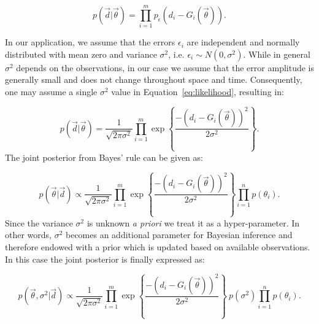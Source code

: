 \begin{equation} 
p(\vec d |  \vec{\theta}) 
= 
\prod_{i=1}^m  
p_\epsilon (d_i - G_i(\vec \theta)).  	
\label{eq:likelihood}
\end{equation}

In our application, we assume that the errors $\epsilon_i$ are independent
and normally distributed with mean
zero and variance $\sigma^2$, i.e. $\epsilon_i \sim N(0,\sigma^2)$. 
While in general $\sigma^2$ depends on the observations, in our case we assume that the error
amplitude is generally small and does not change throughout space and time.
Consequently, one may assume a single $\sigma^2$ value in Equation~\eqref{eq:likelihood},
resulting in:

\begin{equation} 
p(\vec d |  \vec{\theta}) 
= 
\frac{1}{\sqrt{2 \pi \sigma^2}}\prod_{i=1}^m   
\exp \left\lbrace \frac{-(d_i - G_i(\vec \theta))^2}{2 \sigma^2} \right\rbrace. 	
\label{eq:likelihood2}
\end{equation}
The joint posterior from Bayes' rule can be given as:

\begin{equation} 
p(\vec{\theta}| \vec d)
\propto
\frac{1}{\sqrt{2 \pi \sigma^2}}   \prod_{i=1}^m  
\exp \left\lbrace \frac{-(d_i - G_i(\vec \theta))^2}{2 \sigma^2} \right\rbrace  
\prod_{i=1}^n p(\theta_i).
\end{equation}
Since the variance $\sigma^2$ is unknown \emph{a priori}\comment{;} we treat it as a hyper-parameter.
In other words, $\sigma^2$ becomes an additional parameter for Bayesian inference and  
therefore endowed with a prior which is updated based on available observations. In this 
case the joint posterior is finally expressed as:

\begin{equation} 
p(\vec{\theta},\sigma^2 | \vec d)
\propto
\frac{1}{\sqrt{2 \pi \sigma^2}}   \prod_{i=1}^m  
\exp \left\lbrace \frac{-(d_i - G_i(\vec \theta))^2}{2 \sigma^2} \right\rbrace
\ p(\sigma^2) \prod_{i=1}^n p(\theta_i).
\label{eq:post}
\end{equation}

